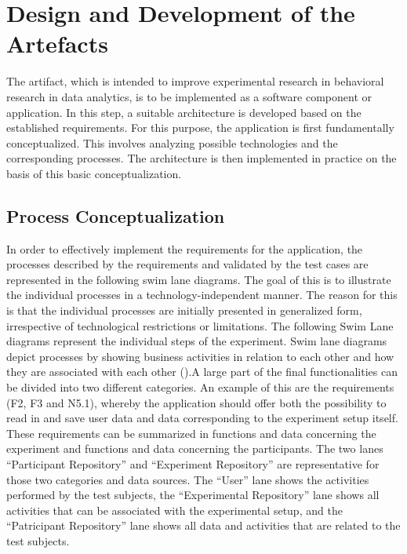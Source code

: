 \newpage\section{Design and Development of the Artefacts}

The artifact, which is intended to improve experimental research in behavioral research in data analytics, is to be implemented as a software component or application. In this step, a suitable architecture is developed based on the established requirements. For this purpose, the application is first fundamentally conceptualized. This involves analyzing possible technologies and the corresponding processes. The architecture is then implemented in practice on the basis of this basic conceptualization.

\subsection{Process Conceptualization}\label{subsec:ProcessConcept}



In order to effectively implement the requirements for the application, the processes described by the requirements and validated by the test cases are represented in the following swim lane diagrams. The goal of this is to illustrate the individual processes in a technology-independent manner. The reason for this is that the individual processes are initially presented in generalized form, irrespective of technological restrictions or limitations. The following Swim Lane diagrams represent the individual steps of the experiment. Swim lane diagrams depict processes by showing business activities in relation to each other and how they are associated with each other (\cite{Caudle.2009}).A large part of the final functionalities can be divided into two different categories. An example of this are the requirements (F2, F3 and N5.1), whereby the application should offer both the possibility to read in and save user data and data corresponding to the experiment setup itself. These requirements can be summarized in functions and data concerning the experiment and functions and data concerning the participants. The two lanes \enquote{Participant Repository} and \enquote{Experiment Repository} are representative for those two categories and data sources. The \enquote{User} lane shows the activities performed by the test subjects, the \enquote{Experimental Repository} lane shows all activities that can be associated with the experimental setup, and the \enquote{Patricipant Repository} lane shows all data and activities that are related to the test subjects. 

